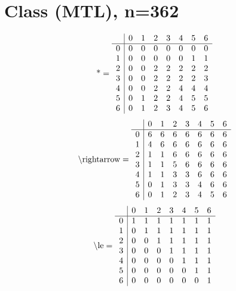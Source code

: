 \documentclass[11pt]{article}
\begin{document}
\section{Class (MTL), n=362}
\[\text{*} = 
\begin{array}{r | r r r r r r r}
 & 0 & 1 & 2 & 3 & 4 & 5 & 6 \\ \hline
0 & 0 & 0 & 0 & 0 & 0 & 0 & 0 \\
1 & 0 & 0 & 0 & 0 & 0 & 1 & 1 \\
2 & 0 & 0 & 2 & 2 & 2 & 2 & 2 \\
3 & 0 & 0 & 2 & 2 & 2 & 2 & 3 \\
4 & 0 & 0 & 2 & 2 & 4 & 4 & 4 \\
5 & 0 & 1 & 2 & 2 & 4 & 5 & 5 \\
6 & 0 & 1 & 2 & 3 & 4 & 5 & 6 \\
\end{array}
\]
\[\text{\textbackslash rightarrow} = 
\begin{array}{r | r r r r r r r}
 & 0 & 1 & 2 & 3 & 4 & 5 & 6 \\ \hline
0 & 6 & 6 & 6 & 6 & 6 & 6 & 6 \\
1 & 4 & 6 & 6 & 6 & 6 & 6 & 6 \\
2 & 1 & 1 & 6 & 6 & 6 & 6 & 6 \\
3 & 1 & 1 & 5 & 6 & 6 & 6 & 6 \\
4 & 1 & 1 & 3 & 3 & 6 & 6 & 6 \\
5 & 0 & 1 & 3 & 3 & 4 & 6 & 6 \\
6 & 0 & 1 & 2 & 3 & 4 & 5 & 6 \\
\end{array}
\]
\[\text{\textbackslash le} = 
\begin{array}{r | r r r r r r r}
 & 0 & 1 & 2 & 3 & 4 & 5 & 6 \\ \hline
0 & 1 & 1 & 1 & 1 & 1 & 1 & 1 \\
1 & 0 & 1 & 1 & 1 & 1 & 1 & 1 \\
2 & 0 & 0 & 1 & 1 & 1 & 1 & 1 \\
3 & 0 & 0 & 0 & 1 & 1 & 1 & 1 \\
4 & 0 & 0 & 0 & 0 & 1 & 1 & 1 \\
5 & 0 & 0 & 0 & 0 & 0 & 1 & 1 \\
6 & 0 & 0 & 0 & 0 & 0 & 0 & 1 \\
\end{array}
\]
\end{document}
